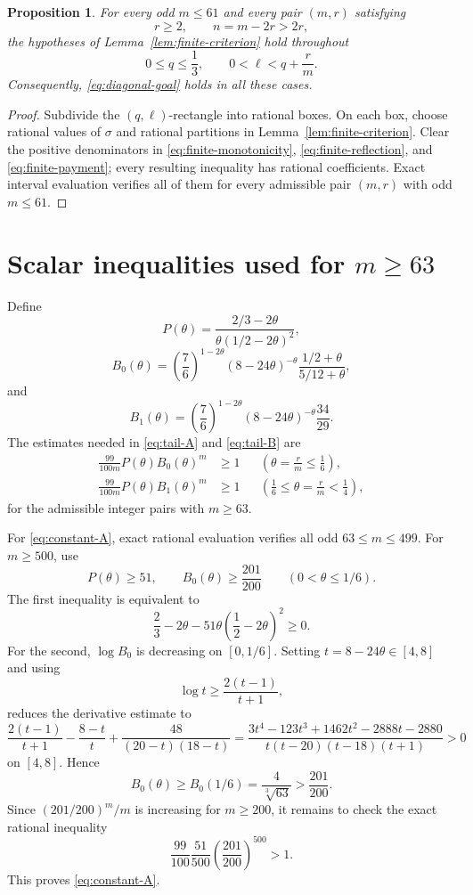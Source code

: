 \documentclass[11pt]{article}
\numberwithin{equation}{section}
\newtheorem{proposition}[theorem]{Proposition}
\begin{document}
\begin{proposition}\label{prop:finite}
For every odd $m\le61$ and every pair $(m,r)$ satisfying
\[
        r\ge2,
        \qquad n=m-2r>2r,
\]
the hypotheses of Lemma~\ref{lem:finite-criterion} hold throughout
\[
        0\le q\le\frac13,
        \qquad
        0<\ell<q+\frac rm.
\]
Consequently, \eqref{eq:diagonal-goal} holds in all these cases.
\end{proposition}

\begin{proof}
Subdivide the $(q,\ell)$-rectangle into rational boxes. On each box, choose rational values of $\sigma$ and rational partitions in Lemma~\ref{lem:finite-criterion}. Clear the positive denominators in \eqref{eq:finite-monotonicity}, \eqref{eq:finite-reflection}, and \eqref{eq:finite-payment}; every resulting inequality has rational coefficients. Exact interval evaluation verifies all of them for every admissible pair $(m,r)$ with odd $m\le61$.
\end{proof}

\section{Scalar inequalities used for \texorpdfstring{$m\ge63$}{m >= 63}}\label{app:constants}

Define
\[
 P(\theta)=\frac{2/3-2\theta}{\theta(1/2-2\theta)^2},
\]
\[
 B_0(\theta)=
 \left(\frac76\right)^{1-2\theta}
 (8-24\theta)^{-\theta}
 \frac{1/2+\theta}{5/12+\theta},
\]
and
\[
 B_1(\theta)=
 \left(\frac76\right)^{1-2\theta}
 (8-24\theta)^{-\theta}
 \frac{34}{29}.
\]
The estimates needed in \eqref{eq:tail-A} and \eqref{eq:tail-B} are
\begin{align}
 \frac{99}{100m}P(\theta)B_0(\theta)^m&\ge1
 &&\left(\theta=\frac rm\le\frac16\right),\label{eq:constant-A}\\
 \frac{99}{100m}P(\theta)B_1(\theta)^m&\ge1
 &&\left(\frac16\le\theta=\frac rm<\frac14\right),\label{eq:constant-B}
\end{align}
for the admissible integer pairs with $m\ge63$.

For \eqref{eq:constant-A}, exact rational evaluation verifies all odd $63\le m\le499$. For $m\ge500$, use
\[
        P(\theta)\ge51,
        \qquad
        B_0(\theta)\ge\frac{201}{200}
        \qquad(0<\theta\le1/6).
\]
The first inequality is equivalent to
\[
        \frac23-2\theta
        -51\theta\left(\frac12-2\theta\right)^2\ge0.
\]
For the second, $\log B_0$ is decreasing on $[0,1/6]$. Setting $t=8-24\theta\in[4,8]$ and using
\[
        \log t\ge\frac{2(t-1)}{t+1},
\]
reduces the derivative estimate to
\[
 \frac{2(t-1)}{t+1}-\frac{8-t}{t}
 +\frac{48}{(20-t)(18-t)}
 =\frac{3t^4-123t^3+1462t^2-2888t-2880}
 {t(t-20)(t-18)(t+1)}>0
\]
on $[4,8]$. Hence
\[
        B_0(\theta)\ge B_0(1/6)
        =\frac4{\sqrt[3]{63}}>\frac{201}{200}.
\]
Since $(201/200)^m/m$ is increasing for $m\ge200$, it remains to check the exact rational inequality
\[
        \frac{99}{100}\frac{51}{500}
        \left(\frac{201}{200}\right)^{500}>1.
\]
This proves \eqref{eq:constant-A}.
\end{document}
